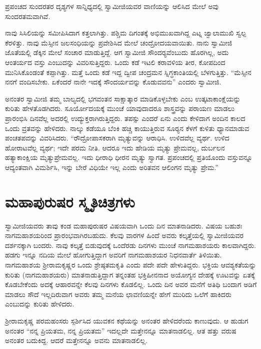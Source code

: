  ಪ್ರಪಂಚದ ಸುಂದರತರ ದೃಶ್ಯಗಳ ಸಾನ್ನಿಧ್ಯದಲ್ಲಿ ಸ್ವಾಮೀಜಿಯವರ ವಾಣಿಯನ್ನು ಆಲಿಸಿದ ಮೇಲೆ ಅವು ಸುಂದರತಮವಾಗಿವೆ. 

 ನಾವು ಸಿಸಿಲಿಯನ್ನು ಸಮೀಪಿಸಿದಾಗ ಕತ್ತಲಾಗಿತ್ತು. ಪಶ್ಚಿಮ ದಿಗಂತಕ್ಕೆ ಅಭಿಮುಖವಾಗಿದ್ದ ಎಟ್ನ ಜ್ವಾಲಾಮುಖಿ ಸ್ವಲ್ಪ ಕೆರಳಿತ್ತು. ನಾವು ಮೆಸ್ಸೀನ ಜಲಸಂಧಿಯನ್ನು ಪ್ರವೇಶಿಸಿದ ಮೇಲೆ ಚಂದ್ರೋದಯವಾಯಿತು. ನಾನು ಸ್ವಾಮೀಜಿ ಜೊತೆಯಲ್ಲಿ ಡೆಕ್ಕಿನ ಮೇಲೆ ಸಂಚಾರ ಮಾಡುತ್ತಿದ್ದೆ. ಆಗ ಸ್ವಾಮೀಜಿ ಸೌಂದರ‍್ಯವೆಂಬುದು ಹೊರಗಿಲ್ಲ, ಅದು ಆಂತರ್ಯದ ವಸ್ತು ಎಂಬುದನ್ನು ವಿವರಿಸುತ್ತಿದ್ದರು. ಒಂದು ಕಡೆ ಇಟಲಿ ಕರಾವಳಿಯ ತೀರ, ಕೋಪದಿಂದ ಮುನಿಸಿಕೊಂಡಂತೆ ಕಪ್ಪಾಗಿತ್ತು. ಮತ್ತೆ ಒಂದು ಕಡೆ ಇದ್ದ ದ್ವೀಪ ಚಂದ್ರಮನ ಸ್ನಿಗ್ಧಕಾಂತಿಯಲ್ಲಿ ಬೆಳಗುತ್ತಿತ್ತು. “ಮೆಸ್ಸೀನ ನನಗೆ ವಂದಿಸಬೇಕು. ಏಕೆಂದರೆ ನಾನೇ ಇದಕ್ಕೆ ಸೌಂದರ್ಯವನ್ನು ಕೊಡುವವನು” ಎಂದರು ಸ್ವಾಮೀಜಿ. 

 ಅನಂತರ ಸ್ವಾಮೀಜಿ ತಮ್ಮ ಬಾಲ್ಯದಲ್ಲಿ ಭಗವಂತನ ಸಾಕ್ಷಾತ್ಕಾರ ಮಾಡಿಕೊಳ್ಳಬೇಕು ಎಂಬ ಉತ್ಕಟಾಕಾಂಕ್ಷೆಯನ್ನು ಕುರಿತು ಹೇಳತೊಡಗಿದರು. ಸೂರ್ಯೋದಯಕ್ಕೆ ಮುಂಚೆ ಯಾವುದಾದರೂ ಶಾಸ್ತ್ರವನ್ನು ಪರಾಯಣ ಮಾಡಲು ಪ್ರಾರಂಭಿಸಿ ದಿನವೆಲ್ಲ ಅದರಲ್ಲಿ ಉದ್ಯುಕ್ತರಾಗಿರುತ್ತಿದ್ದರು. ತಪಸ್ಸು ಎಂದರೆ ಏನು ಎಂದು ಕೇಳಿದಾಗ ಅಂದಿನ ಕಾಲದ ಒಂದು ವ್ರತವನ್ನು ಹೇಳಿದರು. ನಾಲ್ಕು ಕಡೆಯೂ ಬೆಂಕಿ ಹಚ್ಚಿ ಕಾಯುತ್ತಿರುವ ಸೂರ‍್ಯನ ಕೆಳಗೆ ಕುಳಿತು ಧ್ಯಾನಮಾಡುವ ಪಂಚತಪವನ್ನು ವಿವರಿಸಿದರು. “ರೌದ್ರೋಪಾಸಕರಾಗಿ ಮೃತ್ಯುವನ್ನು ಆರಾಧಿಸಿ. ಉಳಿದವೆಲ್ಲ ವ್ಯರ್ಥ. ಉಳಿದ ಹೋರಾಟವೆಲ್ಲ ವ್ಯರ್ಥ; ಇದೇ ಪರಮ ನೀತಿ. ಆದರೂ‌ ಇದು ಹೇಡಿಯ ಮೃತ್ಯು ಪ್ರೇಮವಲ್ಲ, ದುರ್ಬಲನ ಹತ್ಯಾಕಾಂಕ್ಷಿಯ ಮೃತ್ಯುಪ್ರೇಮವಲ್ಲ. ಇದು ಧೀರಾಧಿ ಧೀರನ ಮೃತ್ಯು ಸ್ವಾಗತ. ಪ್ರಪಂಚದಲ್ಲಿ ಪ್ರತಿಯೊಂದು ವಸ್ತುವನ್ನೂ ಆದ್ಯಂತವಾಗಿ ವಿಮರ್ಶಿಸಿ, ಇನ್ನು ಬೇರೆ ವಿಧಿಯೇ ಇಲ್ಲ ಎಂದು ಅರಿತವನ ಆಲಿಂಗನ ಮೃತ್ಯು ಪ್ರೇಮ.”


\section*{ಮಹಾಪುರುಷರ ಸ್ಮೃತಿಚಿತ್ರಗಳು}

 ಸ್ವಾಮೀಜಿಯವರು ತಾವು ಕಂಡ ಮಹಾಪುರುಷರ ವಿಷಯವಾಗಿ ಒಂದು ದಿನ ಮಾತನಾಡಿದರು. ವಿಷಯ ಬಹುಶಃ ನಾಗಮಹಾಶಯರಿಂದ ಪ್ರಾರಂಭವಾಗಿರಬಹುದು. ಕೆಲವು ವಾರಗಳ ಹಿಂದೆ ಅವರು ಕಲ್ಕತ್ತೆಯಲ್ಲಿ ಸ್ವಾಮೀಜಿಯವರ ದರ್ಶನಕ್ಕಾಗಿ ಬಂದರು. ನಾವು ಕಲ್ಕತ್ತೆ ಬಿಡುವುದಕ್ಕೆ ಒಂದೆರಡು ದಿನಗಳು ಮುಂಚೆ ನಾಗಮಹಾಶಯರು ಕಾಲವಾಗಿದ್ದರು. ಹಡಗು ಇನ್ನೂ ನದಿಯ ಮೇಲೆ ಹೋಗುತ್ತಿದ್ದಾಗ ಅವರಿಗೆ ನಾಗಮಹಾಶಯರ ನಿಧನವಾರ್ತೆ ತಿಳಿಯಿತು. ನಾಗಮಹಾಶಯ ಶ‍್ರೀರಾಮಕೃಷ್ಣರ ಒಂದು ಶ್ರೇಷ್ಠತಮಕೃತಿ ಎಂದು ಪದೇ ಪದೇ ಹೇಳುತಿದ್ದರು. ಭಕ್ತಿಯ ಆವಶ್ಯಕತೆಯನ್ನು ಕುರಿತು (ನಾಗಮಹಾಶಯರು) ಮಾತನಾಡುತ್ತಿದ್ದಾಗ ತನ್ನಂತಹ ಭಕ್ತಿಹೀನನಾದ ಅಯೋಗ್ಯನ ದೇಹಕ್ಕೆ ಊಟವನ್ನು ಏತಕ್ಕೆ ಕೊಡಬೇಕೆಂದು ಅದಕ್ಕೆ ಆಹಾರವನ್ನೇ ಕೆಲವು ದಿನಗಳು ಕೊಡಲಿಲ್ಲ. ಒಂದು ದಿನ ಅವರ ಮನೆಗೆ ಅತಿಥಿ ಬಂದಾಗ ಅಡಿಗೆ ಮಾಡಲು ಸೌದೆ ಇಲ್ಲದಿರುವಾಗ ಅವರು ತಮ್ಮ ಮನೆಯ ಛಾವಣಿಯನ್ನೇ ಹೇಗೆ ಮುರಿದು ಒಲೆಗೆ ಹಾಕಿದರು ಎಂಬುದನ್ನು ಕುರಿತು ಹೇಳಿದರು. 

 ಶ‍್ರೀರಾಮಕೃಷ್ಣ ಪರಮಹಂಸರು ಸ್ಪರ್ಶಿಸಿದ ಯುವಕನ ಕಥೆಯನ್ನು ಅನಂತರ ಹೇಳಿದರೆಂದು ಕಾಣುವುದು. ಆ ಹುಡುಗ ಅನಂತರ “ನನ್ನ ಪ್ರಿಯತಮ, ನನ್ನ ಪ್ರಿಯತಮ” ಇದಲ್ಲದೇ ಮತ್ತೇನನ್ನೂ ಮಾತನಾಡಲಿಲ್ಲ. ಆತ ಹತ್ತು ವರುಷ ಅನಂತರ ಬದುಕಿದ್ದ. ಆದರೆ ಮತ್ತೇನನ್ನೂ ಅವನು ಮಾತನಾಡಲಿಲ್ಲ. 

